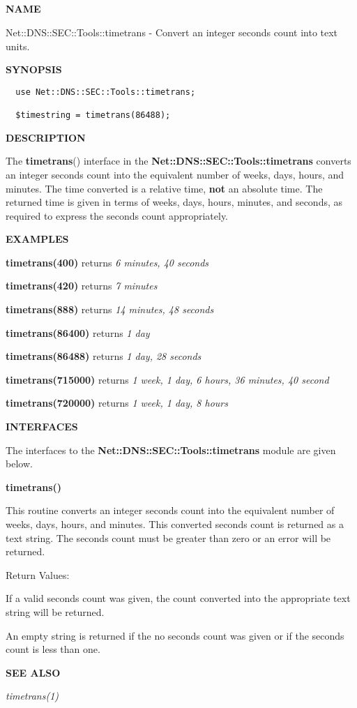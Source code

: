 \clearpage

\subsection{}

{\bf NAME}

Net::DNS::SEC::Tools::timetrans - Convert an integer seconds count into text units.

{\bf SYNOPSIS}

\begin{verbatim}
  use Net::DNS::SEC::Tools::timetrans;

  $timestring = timetrans(86488);
\end{verbatim}

{\bf DESCRIPTION}

The {\bf timetrans}() interface in the {\bf
Net::\-DNS::\-SEC::\-Tools::\-timetrans} converts an integer seconds count
into the equivalent number of weeks, days, hours, and minutes.  The time
converted is a relative time, {\bf not} an absolute time.  The returned time
is given in terms of weeks, days, hours, minutes, and seconds, as required
to express the seconds count appropriately.

{\bf EXAMPLES}

{\bf timetrans(400)} returns {\it 6 minutes, 40 seconds}

{\bf timetrans(420)} returns {\it 7 minutes}

{\bf timetrans(888)} returns {\it 14 minutes, 48 seconds}

{\bf timetrans(86400)} returns {\it 1 day}

{\bf timetrans(86488)} returns {\it 1 day, 28 seconds}

{\bf timetrans(715000)} returns {\it 1 week, 1 day, 6 hours, 36 minutes, 40 second}

{\bf timetrans(720000)} returns {\it 1 week, 1 day, 8 hours}

{\bf INTERFACES}

The interfaces to the {\bf Net::\-DNS::\-SEC::\-Tools::\-timetrans} module
are given below.

{\bf {\bf timetrans()}}

This routine converts an integer seconds count into the equivalent number of
weeks, days, hours, and minutes.  This converted seconds count is returned
as a text string.  The seconds count must be greater than zero or an error
will be returned.

Return Values:

\begin{description}
\item If a valid seconds count was given, the count converted into the
appropriate text string will be returned.

\item An empty string is returned if the no seconds count was given or if
the seconds count is less than one.
\end{description}

{\bf SEE ALSO}

{\it timetrans(1)}

